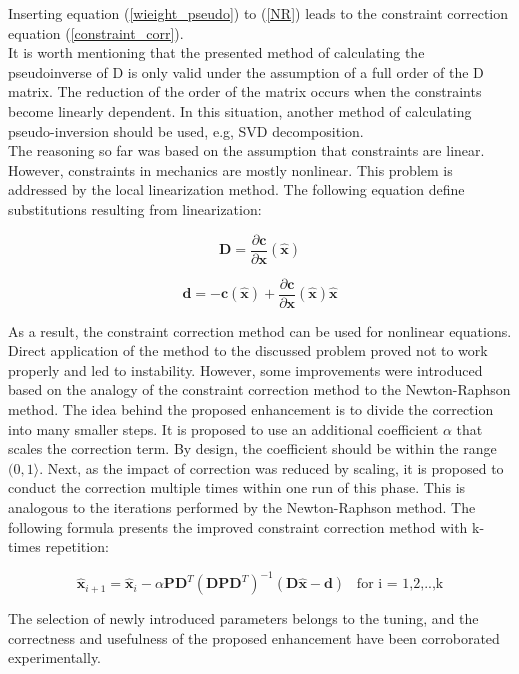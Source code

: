 Inserting equation (\ref{wieight_pseudo}) to (\ref{NR}) leads to the constraint correction equation (\ref{constraint_corr}).\\

It is worth mentioning that the presented method of calculating the pseudoinverse of D is only valid under the assumption of a full order of the D matrix. The reduction of the order of the matrix occurs when the constraints become linearly dependent. In this situation, another method of calculating pseudo-inversion should be used, e.g, SVD decomposition. \cite{golub2013matrix}\\

The reasoning so far was based on the assumption that constraints are linear. 
However, constraints in mechanics are mostly nonlinear. This problem is addressed by the local linearization method. The following equation define substitutions resulting from linearization:

\begin{equation}
	\bm{D} = \frac{\partial \bm{c}}{\partial \bm{x}}(\bm{\hat{x}})
	\label{linearization1}
\end{equation}

\begin{equation}
	\bm{d} =  - \bm{c} (\bm{\hat{x}}) +  \frac{\partial \bm{c}}{\partial \bm{x}}(\bm{\hat{x}}) \bm{\hat{x}}
	\label{linearization2}
\end{equation}

As a result, the constraint correction method can be used for nonlinear equations.\\ 

Direct application of the method to the discussed problem proved not to work properly and led to instability. However, some improvements were introduced based on the analogy of the constraint correction method to the Newton-Raphson method. The idea behind the proposed enhancement is to divide the correction into many smaller steps. It is proposed to use an additional coefficient $\alpha$ that scales the correction term. By design, the coefficient should be within the range $(0, 1 \rangle $. Next, as the impact of correction was reduced by scaling, it is proposed to conduct the correction multiple times within one run of this phase. This is analogous to the iterations performed by the Newton-Raphson method. The following formula presents the improved constraint correction method with k-times repetition:

\begin{equation}
	\bm{\hat{x}}_{i+1} = \bm{\hat{x}}_{i} - \alpha \bm{P} \bm{D}^T \left( \bm{D} \bm{P} \bm{D}^T \right)^{-1} \left( \bm{D} \bm{\hat{x}} - \bm{d}  \right) \hspace{10pt} \text{for i = 1,2,..,k}
	\label{constraint_final}
\end{equation}

The selection of newly introduced parameters belongs to the tuning, and the correctness and usefulness of the proposed enhancement have been corroborated experimentally.